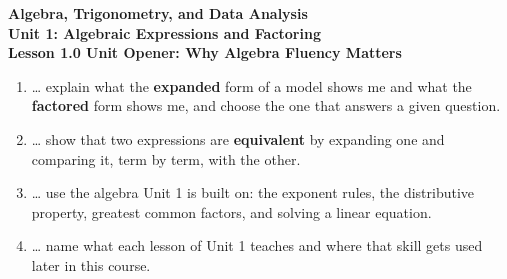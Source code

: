 \documentclass[10pt]{article}
\begin{document}
\vspace{-0.8in}

\begin{center}
  {\color{white}\textbf{\LARGE Algebra, Trigonometry, and Data Analysis}}\\[4pt]
  {\color{mistmid}\large\textbf{Unit 1: Algebraic Expressions and Factoring}}\\[6pt]
  {\color{white}\textbf{\large Lesson 1.0 \quad Unit Opener: Why Algebra Fluency Matters}}
\end{center}

\vspace{0.22in}
\namedateperiod
\vspace{0.18in}

\begin{learningtargetbox}
\small
\begin{enumerate}[leftmargin=1.5em, itemsep=5pt]
  \item \ldots{} explain what the \textbf{expanded} form of a model shows me and what the
        \textbf{factored} form shows me, and choose the one that answers a given question.
  \item \ldots{} show that two expressions are \textbf{equivalent} by expanding one and comparing
        it, term by term, with the other.
  \item \ldots{} use the algebra Unit 1 is built on: the exponent rules, the distributive
        property, greatest common factors, and solving a linear equation.
  \item \ldots{} name what each lesson of Unit 1 teaches and where that skill gets used later in
        this course.
\end{enumerate}
\end{learningtargetbox}

\vspace{0.14in}
\end{document}
